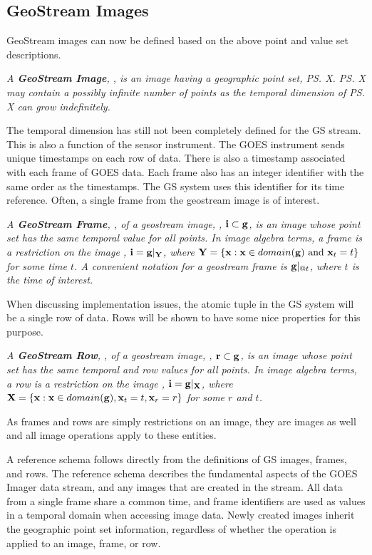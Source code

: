 \documentclass{ucdthesis}       %
\begin{document}
\subsection{GeoStream Images}
\label{sec:images}

GeoStream images can now be defined based on the above point and
value set descriptions.

\emph{A {\bf GeoStream Image}, , is an image having a geographic
  point set, \ps{X}.  \ps{X} may contain a possibly infinite number of
  points as the temporal dimension of \ps{X} can grow indefinitely.}

The temporal dimension has still not been completely defined for the
\ac{GS} stream.  This is also a function of the sensor instrument.
The \ac{GOES} instrument sends unique timestamps on each row of data.
There is also a timestamp associated with each frame of \ac{GOES}
data.  Each frame also has an integer identifier with the same order as
the timestamps.  The \ac{GS} system uses this identifier for its time
reference.  Often, a single frame from the geostream image is of
interest.

\emph{A {\bf GeoStream Frame}, , of a geostream image, ,
  ${\bf{i}} \subset {\ensuremath{\bf{g}}}$, is an image whose point set has the same
  temporal value for all points.  In image algebra terms, a frame is a
  restriction on the image , ${\bf{i}}={\bf{g}}|_{{\bf{Y}}}$, where
  ${\bf{Y}} = \{{\bf{x}} : {\bf{x}} \in domain({\bf{g}}) \text{ and }
  {\ensuremath{\bf{x}}}_t = t\}$ for some time $t$.  A convenient notation for a
  geostream frame is ${\bf{g}}|_{@t}$, where $t$ is the time of
  interest.}

When discussing implementation issues, the atomic tuple in the \ac{GS}
system will be a single row of data.  Rows will be shown to have
some nice properties for this purpose.

\emph{A {\bf GeoStream Row}, , of a geostream image, ,
  ${\bf{r}} \subset {\ensuremath{\bf{g}}}$, is an image whose point set has the same
  temporal and row values for all points.  In image algebra terms, a
  row is a restriction on the image , ${\bf{i}}={\bf{g}}|_{\bf{X}}$,
  where ${\bf{X}} = \{{\bf{x}} : {\bf{x}} \in domain({\bf{g}}), {\bf{x}}_t=t,
  {\bf{x}}_r=r\}$ for some $r$ and $t$.}

As frames and rows are simply restrictions on an image, they are
images as well and all image operations apply to these entities.

A reference schema follows directly from the definitions of \ac{GS}
images, frames, and rows.  The reference schema describes the
fundamental aspects of the \ac{GOES} Imager data stream, and any
images that are created in the stream.  All data from a single frame
share a common time, and frame identifiers are used as values in a
temporal domain when accessing image data.  Newly created images
inherit the geographic point set information, regardless of whether
the operation is applied to an image, frame, or row.
\end{document}

